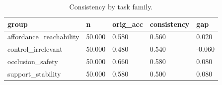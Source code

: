\begin{table}[t]
\centering
\begin{tabular}{lllll}
\toprule
group & n & orig_acc & consistency & gap \\
\midrule
affordance_reachability & 50.000 & 0.580 & 0.560 & 0.020 \\
control_irrelevant & 50.000 & 0.480 & 0.540 & -0.060 \\
occlusion_safety & 50.000 & 0.660 & 0.580 & 0.080 \\
support_stability & 50.000 & 0.580 & 0.500 & 0.080 \\
\bottomrule
\end{tabular}
\caption{Consistency by task family.}
\end{table}
